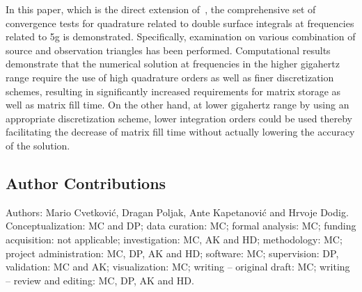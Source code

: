 In this paper, which is the direct extension of~\cite{Cvetkovic2021Study}, the comprehensive set of convergence tests for quadrature related to double surface integrals at frequencies related to \gls{5g} is demonstrated.
Specifically, examination on various combination of source and observation triangles has been performed.
Computational results demonstrate that the numerical solution at frequencies in the higher gigahertz range require the use of high quadrature orders as well as finer discretization schemes, resulting in significantly increased requirements for matrix storage as well as matrix fill time.
On the other hand, at lower gigahertz range by using an appropriate discretization scheme, lower integration orders could be used thereby facilitating the decrease of matrix fill time without actually lowering the accuracy of the solution.

\subsection{Author Contributions}
Authors: Mario Cvetković, Dragan Poljak, Ante Kapetanović and Hrvoje Dodig.\\
Conceptualization: MC and DP; data curation: MC; formal analysis: MC; funding acquisition: not applicable; investigation: MC, AK and HD; methodology: MC; project administration: MC, DP, AK and HD; software: MC; supervision: DP, validation: MC and AK; visualization: MC; writing -- original draft: MC; writing -- review and editing: MC, DP, AK and HD.
